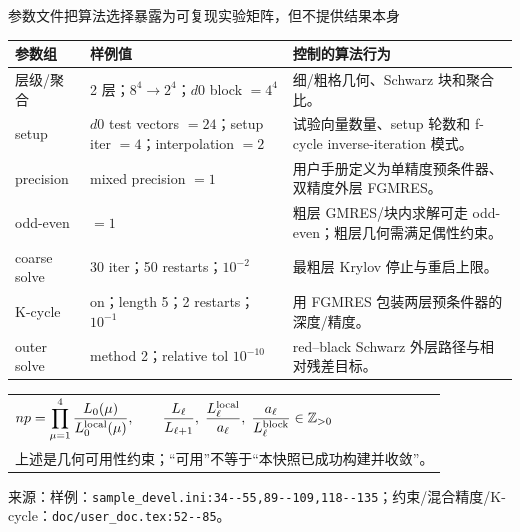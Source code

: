 \documentclass[UTF8,aspectratio=169,11pt]{ctexbeamer}
\newcommand{\source}[1]{%
  \vspace{0.06em}\par{\raggedright\scriptsize\color{muted}来源：#1\par}}
\newcommand{\code}[1]{\nolinkurl{#1}}
\newcommand{\denseframe}{%
  \footnotesize
  \setlength{\tabcolsep}{2.5pt}%
  \renewcommand{\arraystretch}{0.76}%
}
\begin{document}
\begin{frame}[t]{参数文件把算法选择暴露为可复现实验矩阵，但不提供结果本身}
  \denseframe
  \scriptsize
  \begin{tabularx}{0.96\textwidth}{@{}p{}p{}Y@{}}
    \toprule
    参数组 & 样例值 & 控制的算法行为 \\
    \midrule
    层级/聚合 & 2 层；$8^4\to2^4$；$d0$ block $=4^4$ & 细/粗格几何、Schwarz 块和聚合比。 \\
    setup & $d0$ test vectors $=24$；setup iter $=4$；interpolation $=2$ & 试验向量数量、setup 轮数和 f-cycle inverse-iteration 模式。 \\
    precision & mixed precision $=1$ & 用户手册定义为单精度预条件器、双精度外层 FGMRES。 \\
    odd-even & $=1$ & 粗层 GMRES/块内求解可走 odd-even；粗层几何需满足偶性约束。 \\
    coarse solve & 30 iter；50 restarts；$10^{-2}$ & 最粗层 Krylov 停止与重启上限。 \\
    K-cycle & on；length 5；2 restarts；$10^{-1}$ & 用 FGMRES 包装两层预条件器的深度/精度。 \\
    outer solve & method 2；relative tol $10^{-10}$ & red--black Schwarz 外层路径与相对残差目标。 \\
    \bottomrule
  \end{tabularx}
  \vspace{0.12cm}
  \begin{tabular}{@{}l@{}}
    $np=\displaystyle\prod_{\mu=1}^{4}\frac{L_0(\mu)}{L^{\rm local}_0(\mu)},\qquad
      \frac{L_\ell}{L_{\ell+1}},\;\frac{L^{\rm local}_\ell}{a_\ell},\;\frac{a_\ell}{L^{\rm block}_\ell}\in\mathbb{Z}_{>0}$ \\
    \quad 上述是几何可用性约束；“可用”不等于“本快照已成功构建并收敛”。
  \end{tabular}
  \source{样例：\code{sample_devel.ini:34--55,89--109,118--135}；约束/混合精度/K-cycle：\code{doc/user_doc.tex:52--85}。}
\end{frame}
\end{document}
